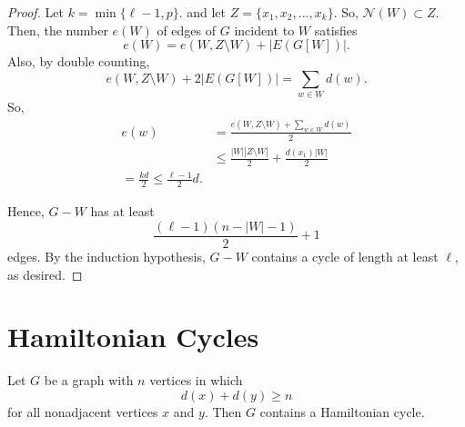 \begin{proof}
    Let \(k = \min\{\ell - 1, p\}\).
    and let \(Z = \{x_1, x_2, \dots, x_k\}\).
    So, \(\mathcal{N}(W) \subset Z\).
    Then, the number \(e(W)\) of edges of \(G\) incident to \(W\)
    satisfies 
    \begin{equation}
        e(W) = e(W, Z \setminus W) + |E(G[W])|.
    \end{equation}
    Also, by double counting,
    \begin{equation}
        e(W, Z \setminus W) + 2|E(G[W])| = \sum_{w \in W} d(w).
    \end{equation}
    So,
    \begin{align}
        e(w) &= \frac{e(W, Z \setminus W) + \sum_{w \in W} d(w)}{2} \\
             &\leq \frac{|W| |Z \setminus W|}{2} + \frac{d(x_1)|W|}{2} \\
             = \frac{kd}{2} \leq \frac{\ell-1}{2} d.
    \end{align}

    Hence, \(G - W\) has at least 
    \begin{equation}
        \frac{(\ell - 1)(n-|W|-1)}{2} + 1
    \end{equation}
    edges.
    By the induction hypothesis,
    \(G - W\) contains a cycle of length at least \(\ell\),
    as desired.
\end{proof}

\section{Hamiltonian Cycles}

\begin{theorem} \label{thm:dirac-posa}
    Let \(G\) be a graph with \(n\) vertices
    in which
    \begin{equation} \label{eq:dirac-posa}
        d(x) + d(y) \geq n
    \end{equation}
    for all nonadjacent vertices \(x\) and \(y\).
    Then \(G\) contains a Hamiltonian cycle.
\end{theorem}

